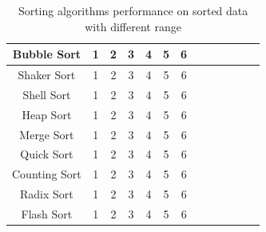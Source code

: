 \documentclass[11pt,a4paper]{article}
\begin{document}
{\begin{table}[H]
{\begin{tabular}{|c|c|c|c|c|c|c|c|c|c|c|c|c|}
		 \hline
		 Bubble Sort 	& 1 & 2 & 3 & 4 & 5 & 6\\
		 \hline
		 Shaker Sort 	& 1 & 2 & 3 & 4 & 5 & 6\\
		 \hline
		 Shell Sort		& 1 & 2 & 3 & 4 & 5 & 6\\
		 \hline
		 Heap Sort		& 1 & 2 & 3 & 4 & 5 & 6\\
		 \hline
		 Merge Sort		& 1 & 2 & 3 & 4 & 5 & 6\\
		 \hline
		 Quick Sort		& 1 & 2 & 3 & 4 & 5 & 6\\
		 \hline
		 Counting Sort 	& 1 & 2 & 3 & 4 & 5 & 6\\
		 \hline
		 Radix Sort 	& 1 & 2 & 3 & 4 & 5 & 6\\
		 \hline
		 Flash Sort 	& 1 & 2 & 3 & 4 & 5 & 6\\
		 \hline
		\end{tabular}}
		\caption{Sorting algorithms performance on sorted data with different range}
		\end{table}
		
}
\end{document}
